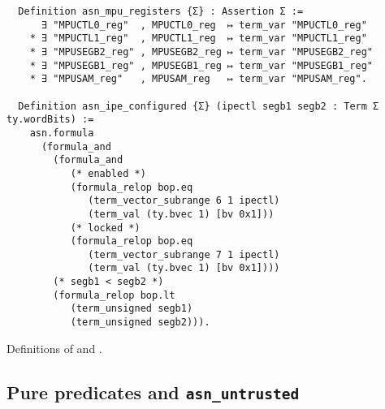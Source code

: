 \begin{listing}[tb]
  \begin{verbatim}
  Definition asn_mpu_registers {Σ} : Assertion Σ :=
      ∃ "MPUCTL0_reg"  , MPUCTL0_reg  ↦ term_var "MPUCTL0_reg"
    * ∃ "MPUCTL1_reg"  , MPUCTL1_reg  ↦ term_var "MPUCTL1_reg"
    * ∃ "MPUSEGB2_reg" , MPUSEGB2_reg ↦ term_var "MPUSEGB2_reg"
    * ∃ "MPUSEGB1_reg" , MPUSEGB1_reg ↦ term_var "MPUSEGB1_reg"
    * ∃ "MPUSAM_reg"   , MPUSAM_reg   ↦ term_var "MPUSAM_reg".

  Definition asn_ipe_configured {Σ} (ipectl segb1 segb2 : Term Σ ty.wordBits) :=
    asn.formula
      (formula_and
        (formula_and
           (* enabled *)
           (formula_relop bop.eq
              (term_vector_subrange 6 1 ipectl)
              (term_val (ty.bvec 1) [bv 0x1]))
           (* locked *)
           (formula_relop bop.eq
              (term_vector_subrange 7 1 ipectl)
              (term_val (ty.bvec 1) [bv 0x1])))
        (* segb1 < segb2 *)
        (formula_relop bop.lt
           (term_unsigned segb1)
           (term_unsigned segb2))).
  \end{verbatim}
  \caption{Definitions of  and .}
  \label{lst:asn_mpu_registers}
\end{listing}


\subsection{Pure predicates and \texttt{asn\_untrusted}}

